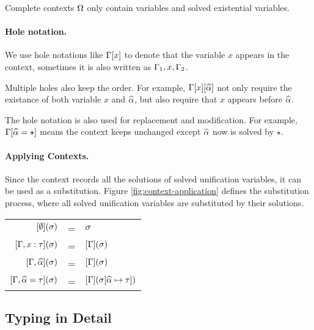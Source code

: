 Complete contexts $\Omega$ only contain variables and solved existential variables.

\paragraph{Hole notation.}
We use hole notations like $\Gamma[x]$ to
denote that the variable $x$ appears in the context, sometimes it is also
written as $\Gamma_1, x, \Gamma_2$.

Multiple holes also keep the order. For example, $\Gamma[x][\widehat{\alpha}]$ not only
require the existance of both variable $x$ and $\widehat{\alpha}$, but also require that
$x$ appears before $\widehat{\alpha}$.

The hole notation is also used for replacement and modification. For example,
$\Gamma[\widehat{\alpha} = \star]$ means the context keeps unchanged except $\widehat{\alpha}$
now is solved by $\star$.

\paragraph{Applying Contexts.} Since the context records all the solutions of
solved unification variables, it can be used as a substitution. Figure
\ref{fig:context-application} defines the substitution process, where all solved
unification variables are substituted by their solutions.

\begin{figure*}[t]
  \centering
  \begin{tabular}{rll}
    $[\emptyset](\sigma)$ & = & $\sigma$ \\
    $[\Gamma, x: \tau](\sigma)$ & = & $[\Gamma](\sigma)$ \\
    $[\Gamma, \widehat{\alpha}](\sigma)$ & = & $[\Gamma](\sigma)$ \\
    $[\Gamma, \widehat{\alpha} = \tau](\sigma)$ & = & $[\Gamma](\sigma [\widehat{\alpha} \mapsto \tau])$\\
  \end{tabular}
    \caption{Context application.}
    \label{fig:context-application}
\end{figure*}

\subsection{Typing in Detail}

\begin{figure*}[t]

    \caption{Typing and semantics.}
    \label{fig:typing}
\end{figure*}

